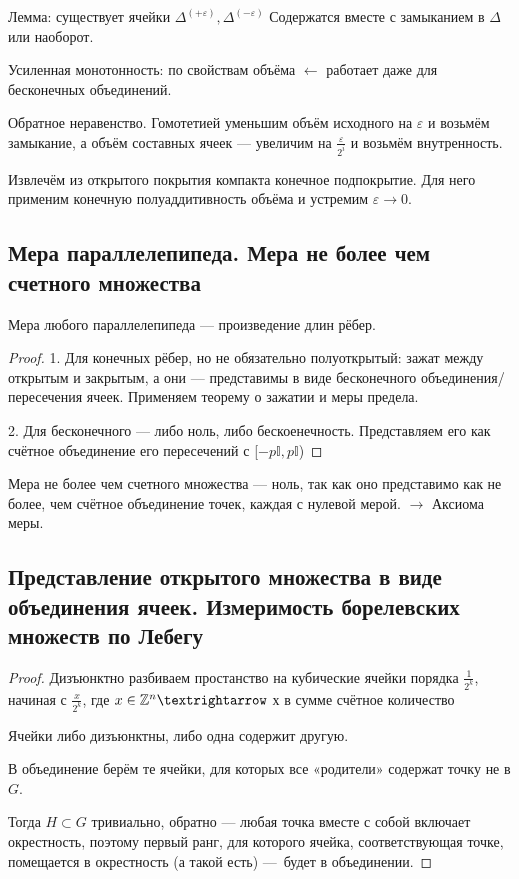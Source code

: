 \documentclass[12pt, a4paper, oneside]{memoir}
\begin{document}
Лемма: существует ячейки $\Delta^{(+\varepsilon)}, \Delta^{(-\varepsilon)}$
Содержатся вместе с замыканием в $\Delta$ или наоборот.


Усиленная монотонность: по свойствам объёма $←$ работает даже для бесконечных объединений.

Обратное неравенство. Гомотетией уменьшим объём исходного на $\varepsilon$ и возьмём замыкание,
а объём составных ячеек — увеличим на $\frac{\varepsilon}{2^i}$ и возьмём внутренность.

Извлечём из открытого покрытия компакта конечное подпокрытие.
Для него применим конечную полуаддитивность объёма и устремим $\varepsilon → 0$.


\subsection{Мера параллелепипеда. Мера не более чем счетного множества}

\begin{theorem}
    Мера любого параллелепипеда — произведение длин рёбер.

    \begin{proof}
        1. Для конечных рёбер, но не обязательно полуоткрытый: зажат между открытым и закрытым,
        а они — представимы в виде бесконечного объединения/пересечения ячеек. Применяем теорему о зажатии и меры предела.
        
        2. Для бесконечного — либо ноль, либо бескоенечность. Представляем его как счётное объединение его пересечений с [$-p \mathbb{I}, p \mathbb{I}$)
    \end{proof}
\end{theorem}

Мера не более чем счетного множества — ноль, так как оно представимо как не более, чем счётное объединение точек, каждая с нулевой мерой. $→$ Аксиома меры.


\subsection{Представление открытого множества в виде объединения ячеек.
Измеримость борелевских множеств по Лебегу}


\begin{theorem}

    \begin{proof}
        Дизъюнктно разбиваем простанство на кубические ячейки порядка $\frac{1}{2^k}$,
        начиная с $\frac{x}{2^k}$, где $x \in \sZ^n →$ х в сумме счётное количество
        
        Ячейки либо дизъюнктны, либо одна содержит другую.

        В объединение берём те ячейки, для которых все «родители» содержат точку не в $G$.

        Тогда $H \subset G$ тривиально, обратно — 
        любая точка вместе с собой включает окрестность, поэтому первый ранг,
        для которого ячейка, соответствующая точке, помещается в окрестность (а такой есть)
        — будет в объединении.
    \end{proof}
\end{theorem}
\end{document}
